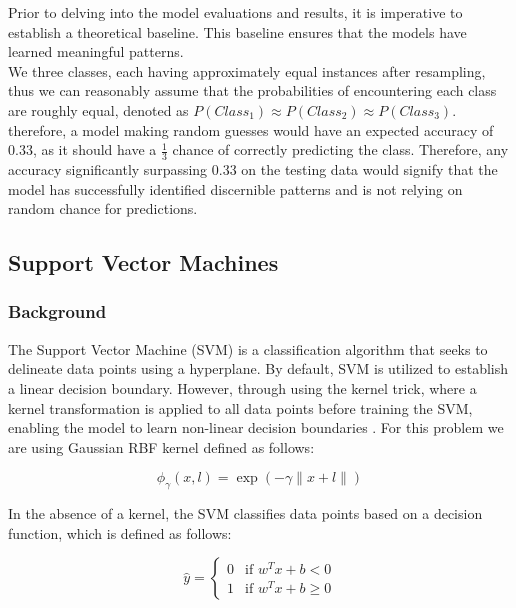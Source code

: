\documentclass{article}
\begin{document}
Prior to delving into the model evaluations and results, it is imperative to establish a theoretical baseline. This baseline ensures that the models have learned meaningful patterns. \\

We three classes, each having approximately equal instances after resampling, thus we can reasonably assume that the probabilities of encountering each class are roughly equal, denoted as $P(Class_1) \approx P(Class_2) \approx P(Class_3)$. therefore, a model making random guesses would have an expected accuracy of 0.33, as it should have a $\frac{1}{3}$ chance of correctly predicting the class. Therefore, any accuracy significantly surpassing 0.33 on the testing data would signify that the model has successfully identified discernible patterns and is not relying on random chance for predictions.\\

\subsection{Support Vector Machines}

\subsubsection{Background}

The Support Vector Machine (SVM) is a classification algorithm that seeks to delineate data points using a hyperplane. By default, SVM is utilized to establish a linear decision boundary. However, through using the kernel trick, where a kernel transformation is applied to all data points before training the SVM, enabling the model to learn non-linear decision boundaries \cite{Geron2019}. For this problem we are using Gaussian RBF kernel defined as follows:

\begin{equation}
    \phi_\gamma(x, l) = \exp (-\gamma \|x + l\|)
\end{equation}

In the absence of a kernel, the SVM classifies data points based on a decision function, which is defined as follows:

\begin{equation}
\hat{y} =
    \begin{cases}
        0 & \text{if } w^Tx + b < 0\\
        1 & \text{if } w^Tx + b \geq 0
    \end{cases}
\end{equation}
\end{document}

